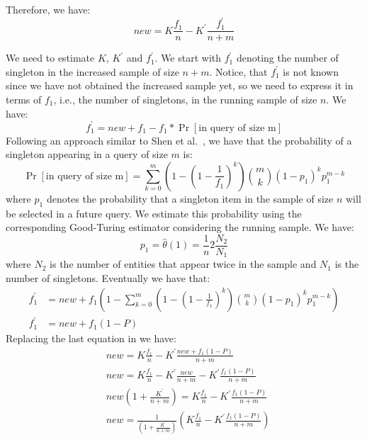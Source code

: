 \documentclass{vldb}
\begin{document}
Therefore, we have:
\begin{equation}
\label{eq:new}
new = K\frac{f_1}{n} - K^{\prime}\frac{f^{\prime}_1}{n+m}
\end{equation}

We need to estimate $K$, $K^{\prime}$ and $f^{\prime}_1$. We start with $f^{\prime}_1$ denoting the number of singleton in the increased sample of size $n+m$. Notice, that $f^{\prime}_1$ is not known since we have not obtained the increased sample yet, so we need to express it in terms of $f_1$, i.e., the number of singletons, in the running sample of size $n$. We have:
\begin{equation}
f^{\prime}_1 = new + f_1 - f_1*\Pr[\mbox{in query of size m}]
\end{equation}
Following an approach similar to Shen et al.~\cite{shen:2003}, we have that the probability of a singleton appearing in a query of size $m$ is:
\begin{equation}
\Pr[\mbox{in query of size m}] = \sum_{k=0}^m(1-(1-\frac{1}{f_1})^k) {m \choose k}(1-p_1)^k p_1^{m-k}
\end{equation}
where $p_1$ denotes the probability that a singleton item in the sample of size $n$ will be selected in a future query. We estimate this probability using the corresponding Good-Turing estimator considering the running sample. We have:
\begin{equation}
p_1 = \hat{\theta}(1) = \frac{1}{n}2\frac{N_2}{N_1}
\end{equation} 
where $N_2$ is the number of entities that appear twice in the sample and $N_1$ is the number of singletons. 
Eventually we have that:
\begin{align}
f^{\prime}_1 &= new + f_1(1- \sum_{k=0}^m(1-(1-\frac{1}{f_1})^k) {m \choose k}(1-p_1)^k p_1^{m-k}) \nonumber \\
f^{\prime}_1 &= new + f_1(1- P)
\end{align}
Replacing the last equation in  we have:
\begin{align}
&new = K\frac{f_1}{n} - K^{\prime}\frac{new + f_1(1- P)}{n+m} \nonumber \\
&new = K\frac{f_1}{n} - K^{\prime}\frac{new}{n+m} - K^{\prime}\frac{f_1(1- P)}{n+m} \nonumber \\
&new(1 + \frac{K^{\prime}}{n+m}) = K\frac{f_1}{n} - K^{\prime}\frac{f_1(1- P)}{n+m} \nonumber \\
&new = \frac{1}{(1 + \frac{K^{\prime}}{n+m})}(K\frac{f_1}{n} - K^{\prime}\frac{f_1(1- P)}{n+m}) \nonumber
\end{align}
\end{document}
